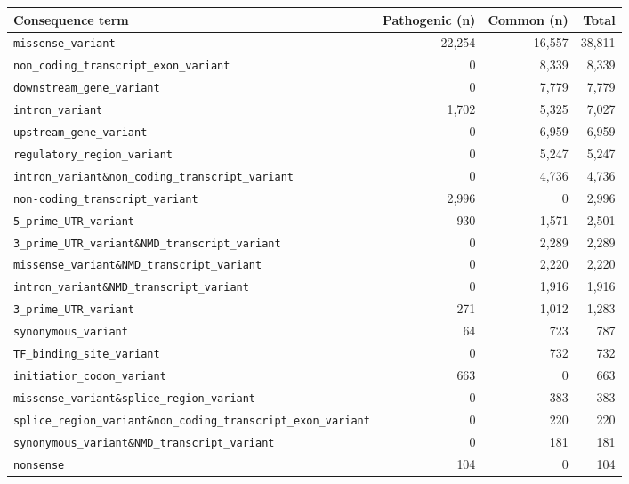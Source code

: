 \begin{tabular}{lrrr}\toprule
Consequence term & Pathogenic (n) & Common (n) & Total\\\midrule
\texttt{missense\_variant} & 22,254 & 16,557 & 38,811\\
\texttt{non\_coding\_transcript\_exon\_variant} & 0 & 8,339 & 8,339\\
\texttt{downstream\_gene\_variant} & 0 & 7,779 & 7,779\\
\texttt{intron\_variant} & 1,702 & 5,325 & 7,027\\
\texttt{upstream\_gene\_variant} & 0 & 6,959 & 6,959\\
\texttt{regulatory\_region\_variant} & 0 & 5,247 & 5,247\\
\texttt{intron\_variant\&non\_coding\_transcript\_variant} & 0 & 4,736 & 4,736\\
\texttt{non-coding\_transcript\_variant} & 2,996 & 0 & 2,996\\
\texttt{5\_prime\_UTR\_variant} & 930 & 1,571 & 2,501\\
\texttt{3\_prime\_UTR\_variant\&NMD\_transcript\_variant} & 0 & 2,289 & 2,289\\
\texttt{missense\_variant\&NMD\_transcript\_variant} & 0 & 2,220 & 2,220\\
\texttt{intron\_variant\&NMD\_transcript\_variant} & 0 & 1,916 & 1,916\\
\texttt{3\_prime\_UTR\_variant} & 271 & 1,012 & 1,283\\
\texttt{synonymous\_variant} & 64 & 723 & 787\\
\texttt{TF\_binding\_site\_variant} & 0 & 732 & 732\\
\texttt{initiatior\_codon\_variant} & 663 & 0 & 663\\
\texttt{missense\_variant\&splice\_region\_variant} & 0 & 383 & 383\\
\texttt{splice\_region\_variant\&non\_coding\_transcript\_exon\_variant} & 0 & 220 & 220\\
\texttt{synonymous\_variant\&NMD\_transcript\_variant} & 0 & 181 & 181\\
\texttt{nonsense} & 104 & 0 & 104\\
\bottomrule\end{tabular}
